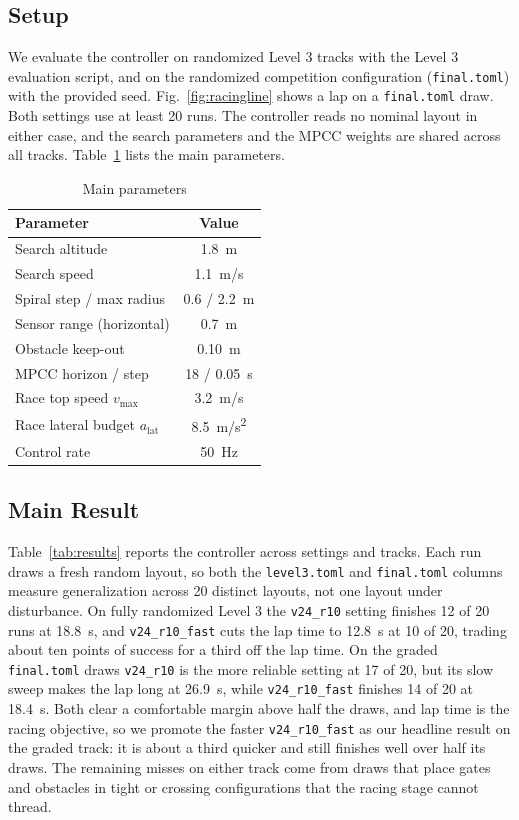 \documentclass[conference]{IEEEtran}
\begin{document}
\subsection{Setup}
We evaluate the controller on randomized Level 3 tracks with the Level 3 evaluation script, and on the randomized competition configuration (\texttt{final.toml}) with the provided seed. Fig.~\ref{fig:racingline} shows a lap on a \texttt{final.toml} draw. Both settings use at least 20 runs. The controller reads no nominal layout in either case, and the search parameters and the MPCC weights are shared across all tracks. Table~\ref{tab:params} lists the main parameters.

\begin{table}[htbp]
\caption{Main parameters}
\begin{center}
\begin{tabular}{|l|c|}
\hline
\textbf{Parameter} & \textbf{Value} \\
\hline
Search altitude & 1.8~m \\
\hline
Search speed & 1.1~m/s \\
\hline
Spiral step / max radius & 0.6 / 2.2~m \\
\hline
Sensor range (horizontal) & 0.7~m \\
\hline
Obstacle keep-out & 0.10~m \\
\hline
MPCC horizon / step & 18 / 0.05~s \\
\hline
Race top speed $v_{\max}$ & 3.2~m/s \\
\hline
Race lateral budget $a_{\text{lat}}$ & 8.5~m/s\textsuperscript{2} \\
\hline
Control rate & 50~Hz \\
\hline
\end{tabular}
\label{tab:params}
\end{center}
\end{table}

\subsection{Main Result}
Table~\ref{tab:results} reports the controller across settings and tracks. Each run draws a fresh random layout, so both the \texttt{level3.toml} and \texttt{final.toml} columns measure generalization across 20 distinct layouts, not one layout under disturbance. On fully randomized Level 3 the \texttt{v24\_r10} setting finishes 12 of 20 runs at 18.8~s, and \texttt{v24\_r10\_fast} cuts the lap time to 12.8~s at 10 of 20, trading about ten points of success for a third off the lap time. On the graded \texttt{final.toml} draws \texttt{v24\_r10} is the more reliable setting at 17 of 20, but its slow sweep makes the lap long at 26.9~s, while \texttt{v24\_r10\_fast} finishes 14 of 20 at 18.4~s. Both clear a comfortable margin above half the draws, and lap time is the racing objective, so we promote the faster \texttt{v24\_r10\_fast} as our headline result on the graded track: it is about a third quicker and still finishes well over half its draws. The remaining misses on either track come from draws that place gates and obstacles in tight or crossing configurations that the racing stage cannot thread.
\end{document}

